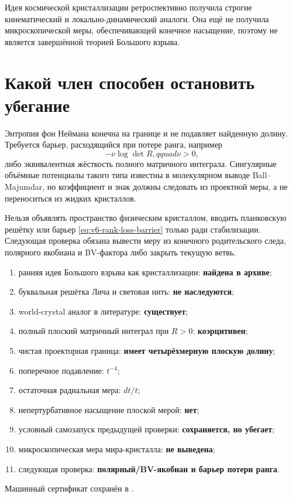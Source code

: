 \begin{proposition}
Идея космической кристаллизации ретроспективно получила строгие
кинематический и локально-динамический аналоги. Она ещё не получила
микроскопической меры, обеспечивающей конечное насыщение, поэтому не
является завершённой теорией Большого взрыва.
\end{proposition}

\section{Какой член способен остановить убегание}

Энтропия фон Неймана конечна на границе и не подавляет найденную долину.
Требуется барьер, расходящийся при потере ранга, например
\begin{equation}
 -\nu\log\det R,qquad \nu>0,
 \label{eq:v6-rank-loss-barrier}
\end{equation}
либо эквивалентная жёсткость полного матричного интеграла. Сингулярные
объёмные потенциалы такого типа известны в молекулярном выводе
Ball--Majumdar, но коэффициент и знак должны следовать из проектной меры,
а не переноситься из жидких кристаллов.

\begin{nogocriterion}
Нельзя объявлять пространство физическим кристаллом, вводить планковскую
решётку или барьер \eqref{eq:v6-rank-loss-barrier} только ради стабилизации.
Следующая проверка обязана вывести меру из конечного родительского следа,
полярного якобиана и BV-фактора либо закрыть текущую ветвь.
\end{nogocriterion}

\begin{protocol}
\begin{enumerate}
 \item ранняя идея Большого взрыва как кристаллизации:
 \textbf{найдена в архиве};
 \item буквальная решётка Лича и световая нить:
 \textbf{не наследуются};
 \item world-crystal аналог в литературе:
 \textbf{существует};
 \item полный плоский матричный интеграл при $R>0$:
 \textbf{коэрцитивен};
 \item чистая проекторная граница:
 \textbf{имеет четырёхмерную плоскую долину};
 \item поперечное подавление:
 \textbf{$t^{-4}$};
 \item остаточная радиальная мера:
 \textbf{$dt/t$};
 \item непертурбативное насыщение плоской мерой:
 \textbf{нет};
 \item условный самозапуск предыдущей проверки:
 \textbf{сохраняется, но убегает};
 \item микроскопическая мера мира-кристалла:
 \textbf{не выведена};
 \item следующая проверка:
 \textbf{полярный/BV-якобиан и барьер потери ранга}.
\end{enumerate}
\end{protocol}

Машинный сертификат сохранён в
.